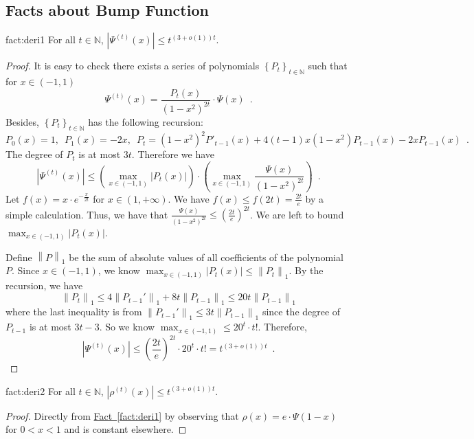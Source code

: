 \documentclass[12pt]{article}
\newcommand{\fct}[1]{\hyperref[fact:#1]{Fact~\ref*{fact:#1}}}
\newcommand{\N}{\mathbb{N}}  \newcommand{\R}{\mathbb{R}} \newcommand{\C}{\mathbb{C}} \newcommand{\U}{\mathbb{U}} \renewcommand{\d}{\mathrm{d}} \DeclareMathOperator*{\E}{\mathbb{E}}  \newcommand{\so}{\mathrm{SO}} \newcommand{\s}{\mathrm{S}} \newcommand{\su}{\mathrm{SU}} \renewcommand{\i}{\mathrm{i}} \newcommand{\A}{\mathcal{A}}  \newcommand{\B}{\mathcal{B}} \newcommand{\CC}{\mathcal{C}} \newcommand{\D}{\mathcal{D}} \newcommand{\F}{\mathcal{F}} \renewcommand{\H}{\mathcal{H}} \newcommand{\K}{\mathcal{K}} \newcommand{\NN}{\mathcal{N}} \newcommand{\V}{\mathcal{V}} \newcommand{\X}{\mathcal{X}} \newcommand{\Y}{\mathcal{Y}} \renewcommand{\S}{\mathcal{S}} \newcommand{\SR}{\mathcal{S}_{\R}} \newcommand{\SC}{\mathcal{S}_{\C}} \newcommand{\EE}{\mathcal{E}}  \newcommand{\PP}{\mathcal{P}} \newcommand{\KK}{\widetilde{K}} \newcommand{\LL}{\widetilde{L}} \newcommand{\W}{\widehat{W}} \newcommand{\f}{\hat{f}} \newcommand{\g}{\hat{g}} \newcommand{\h}{\hat{h}} \newcommand{\bit}[1]{\{0,1\}^{#1}} \newcommand{\wrt}{w.r.t.~} \newcommand{\us}{\overset{\$}{\leftarrow}} \newcommand{\set}[1]{\left\{#1\right\}} \newcommand{\lhs}{\mathrm{LHS}} \newcommand{\expec}[1]{\E\!\Br{#1}} \newcommand{\expect}[2]{\E_{\substack{#1}}\!\Br{#2}} \newcommand{\prob}[2]{\underset{#1}{\mathrm{Pr}}\!\Br{#2}} \newcommand{\cf}{\widetilde{f}} \newcommand{\cg}{\widetilde{g}} \newcommand{\ch}{\widetilde{h}} \newcommand{\ck}{\widetilde{K}} \newcommand{\rep}[2]{\br{#1}_{#2}} \newcommand{\AND}[1]{\mathrm{AND}\!\br{#1}}
\newcommand{\br}[1]{\left(#1\right)} \newcommand{\Br}[1]{\left[#1\right]} \newcommand{\st}[1]{\left\{#1\right\}} \newcommand{\tr}[1]{\mathrm{Tr}\!\Br{#1}} \newcommand{\abs}[1]{\left|#1 \right|} \newcommand{\norm}[1]{\left\lVert #1 \right\rVert} \newcommand{\agl}[2]{\theta^{\br{#1}}_{#2}} \newcommand{\aglp}[2]{{\theta'}^{\br{#1}}_{#2}} \newcommand{\lint}[1]{\left\lfloor#1\right\rfloor} \newcommand{\poly}[1]{\mathrm{poly}\!\br{#1}} \newcommand{\negl}[1]{\mathrm{negl}\!\br{#1}} \newcommand{\de}[1]{\mathrm{d}#1} \newcommand{\val}[1]{\mathrm{val}\!\br{#1}} \newcommand{\vall}[1]{\mathrm{val}\br{#1}} \newcommand{\nd}[1]{\mathcal{N}\!\br{#1}} \newcommand{\ketbratwo}[2]{\ket{#1} \hspace{-0.4em}\bra{#2}} \newcommand{\ketbra}[1]{\ketbratwo{#1}{#1}} \newcommand{\id}{\ensuremath{\mathds{1}}} \newcommand{\ogroup}[1]{\mathrm{O}\!\br{#1}} \newcommand{\ugroup}[1]{\mathrm{U}\!\br{#1}} \newcommand{\td}{\mathrm{TD}} \newcommand{\tv}[1]{\norm{#1}_{\mathrm{TV}}} \newcommand {\defeq} {\ensuremath{ \stackrel{\mathrm{def}}{=} }} \newcommand{\vdim}{\ensuremath{N}} \newcommand{\dimin}{\ensuremath{n}} \newcommand{\dimout}{\ensuremath{m}} \newcommand{\ncopy}{\ell} \newcommand{\hspacein}{\H_\mathrm{in}} \newcommand{\hspaceout}{\H_\mathrm{out}} \newcommand{\Sin}{\S(\hspacein)} \newcommand{\Sout}{\S(\hspaceout)} \newcommand{\haar}{\ensuremath{\mu}} \newcommand{\tensorhaar}{\ensuremath{\eta}} \newcommand{\tensorsrss}{\ensuremath{\nu}} \newcommand{\qadvice}{\ensuremath{\rho}} \newcommand{\tp}{\otimes} \newcommand{\wone}[2]{W_1\!\br{#1,#2}}
\begin{document}
 
\newpage



\newpage
\begin{appendices}
\addappheadtotoc
{}

\section{Facts about Bump Function}
\label{sec:fact_bump}

\begin{repfact}{fact:deri1}
		For all $t\in \N$, $\abs{\Psi^{(t)}(x) } \leq t^{(3+o(1))t}$.
\end{repfact}

\begin{proof}
	It is easy to check there exists a series of polynomials $\st{P_t}_{t\in\N}$ such that for $x\in(-1,1)$
	\[
		\Psi^{(t)}(x) = \frac{P_t(x)}{(1-x^2)^{2t}}\cdot \Psi(x)\enspace.
	\]
	Besides, $\st{P_t}_{t\in\N}$ has the following recursion:
	\[
		P_0(x) = 1, \enspace P_1(x)=-2x,\enspace P_{t} = (1-x^2)^2P'_{t-1}(x)+4(t-1)x(1-x^2)P_{t-1}(x)-2xP_{t-1}(x)\enspace.
	\]
	The degree of $P_t$ is at most $3t$.
	Therefore we have
	\[
		\abs{\Psi^{(t)}(x) } \leq \br{\max_{x\in(-1,1)} \abs{P_t(x)}} \cdot
		\br{\max_{x\in(-1,1)} \frac{\Psi(x)}{(1-x^2)^{2t}}}\enspace.
	\]
	Let $f(x) = x\cdot e^{-\frac{x}{2t}}$ for $x\in(1,+\infty)$. We have $f(x)\leq f(2t) = \frac{2t}{e}$ by a simple calculation.
	Thus, we have that $\frac{\Psi(x)}{(1-x^2)^{2t}}\leq \br{\frac{2t}{e}}^{2t}$. We are left to bound $\max_{x\in(-1,1)} \abs{P_t(x)}$.
	
	Define $\norm{P}_1$ be the sum of absolute values of all coefficients of the polynomial $P$.
	Since $x\in(-1,1)$, we know $\max_{x\in(-1,1)} \abs{P_t(x)}\leq \norm{P_t}_1$.
	By the recursion, we have
	\[
		\norm{P_t}_1 \leq 4\norm{P_{t-1}'}_1 + 8t\norm{P_{t-1}}_1 \leq 20t\norm{P_{t-1}}_1
	\]
	where the last inequality is from $\norm{P_{t-1}'}_1\leq 3t\norm{P_{t-1}}_1$ since the degree of $P_{t-1}$ is at most $3t-3$.
	So we know
	$
		\max_{x\in(-1,1)} \leq 20^t\cdot t!.
	$
	Therefore,
	\[
		\abs{\Psi^{(t)}(x) } \leq \br{\frac{2t}{e}}^{2t} \cdot 20^t\cdot t! = t^{(3+o(1))t}\enspace.
	\]
\end{proof}


\begin{repfact}{fact:deri2}
	For all $t\in \N$, $\abs{\rho^{(t)}(x)} \leq t^{(3+o(1))t}$.
\end{repfact}

\begin{proof}
	Directly from \fct{deri1} by observing that
	$\rho(x) =e\cdot \Psi(1-x) $ for $ 0<x<1$ and is constant elsewhere.
\end{proof}


\end{appendices}
\end{document}
